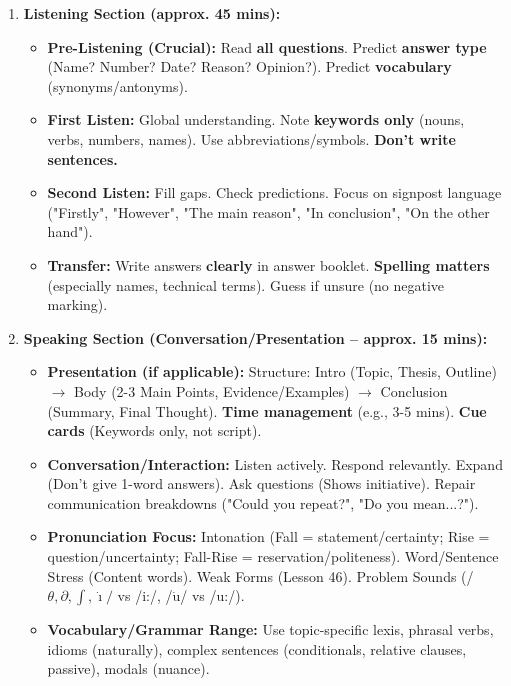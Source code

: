 \documentclass[11pt]{article}
\newcommand{\cle}[1]{{\popxbold\color{popdark}#1}}
\begin{document}
\begin{methode}
\begin{enumerate}
    \item \textbf{Listening Section (approx. 45 mins):}
    \begin{itemize}
        \item \textbf{Pre-Listening (Crucial):} Read \textbf{all questions}. Predict \textbf{answer type} (Name? Number? Date? Reason? Opinion?). Predict \textbf{vocabulary} (synonyms/antonyms).
        \item \textbf{First Listen:} Global understanding. Note \textbf{keywords only} (nouns, verbs, numbers, names). Use abbreviations/symbols. \textbf{Don't write sentences.}
        \item \textbf{Second Listen:} Fill gaps. Check predictions. Focus on \cle{signpost language} ("Firstly", "However", "The main reason", "In conclusion", "On the other hand").
        \item \textbf{Transfer:} Write answers \textbf{clearly} in answer booklet. \textbf{Spelling matters} (especially names, technical terms). Guess if unsure (no negative marking).
    \end{itemize}
    \item \textbf{Speaking Section (Conversation/Presentation -- approx. 15 mins):}
    \begin{itemize}
        \item \textbf{Presentation (if applicable):} \cle{Structure:} Intro (Topic, Thesis, Outline) $\rightarrow$ Body (2-3 Main Points, Evidence/Examples) $\rightarrow$ Conclusion (Summary, Final Thought). \textbf{Time management} (e.g., 3-5 mins). \textbf{Cue cards} (Keywords only, not script).
        \item \textbf{Conversation/Interaction:} \cle{Listen actively}. \cle{Respond relevantly}. \cle{Expand} (Don't give 1-word answers). \cle{Ask questions} (Shows initiative). \cle{Repair} communication breakdowns ("Could you repeat?", "Do you mean...?").
        \item \textbf{Pronunciation Focus:} \cle{Intonation} (Fall = statement/certainty; Rise = question/uncertainty; Fall-Rise = reservation/politeness). \cle{Word/Sentence Stress} (Content words). \cle{Weak Forms} (Lesson 46). \cle{Problem Sounds} (/$\theta, \partial, \int, \mathrm{\dot{\imath}}/$ vs /i:/, /$\mathrm{\dot{u}}$/ vs /u:/).
        \item \textbf{Vocabulary/Grammar Range:} Use \cle{topic-specific lexis}, \cle{phrasal verbs}, \cle{idioms} (naturally), \cle{complex sentences} (conditionals, relative clauses, passive), \cle{modals} (nuance).
    \end{itemize}
\end{enumerate}
\end{methode}
\end{document}

